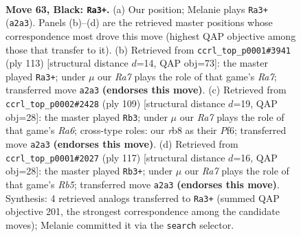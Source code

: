 \documentclass[11pt]{article}
\begin{document}
\clearpage

\begin{figure}[p]\centering
\begin{subfigure}{0.46\textwidth}\centering
\resizebox{\linewidth}{!}{%
\newchessgame
\chessboard[
  setfen={1R6/R4pk1/4p3/8/P3P3/4KP2/r7/8 b - - 18 63},
  showmover=false,
  pgfstyle=straightmove, color=movearrow, markmove={a2-a3}
]}
\caption{}
\end{subfigure}\hfill
\begin{subfigure}{0.46\textwidth}\centering
\resizebox{\linewidth}{!}{%
\newchessgame
\chessboard[
  setfen={8/8/R4pk1/6p1/P5P1/6KP/r7/8 b - - 4 57},
  showmover=false,
  pgfstyle=straightmove, color=movearrow, markmove={a2-a3}
]}
\caption{}
\end{subfigure}
\\[4pt]
\begin{subfigure}{0.46\textwidth}\centering
\resizebox{\linewidth}{!}{%
\newchessgame
\chessboard[
  setfen={8/Rp6/2p1kp2/2P5/P7/r5P1/5PK1/8 b - - 5 55},
  showmover=false,
  pgfstyle=straightmove, color=movearrow, markmove={a3-b3}
]}
\caption{}
\end{subfigure}\hfill
\begin{subfigure}{0.46\textwidth}\centering
\resizebox{\linewidth}{!}{%
\newchessgame
\chessboard[
  setfen={8/R4pk1/8/P6p/1r5P/5KP1/8/8 b - - 0 59},
  showmover=false,
  pgfstyle=straightmove, color=movearrow, markmove={b4-b3}
]}
\caption{}
\end{subfigure}
\caption{\textbf{Move 63, Black: \texttt{Ra3+}.} (a) Our position; Melanie plays \texttt{Ra3+} (\texttt{a2a3}). Panels (b)--(d) are the retrieved master positions whose correspondence most drove this move (highest QAP objective among those that transfer to it). (b) Retrieved from \texttt{ccrl\_top\_p0001\#3941} (ply 113) [structural distance $d$=14, QAP obj=73]: the master played \texttt{Ra3+}; under $\mu$ our \emph{Ra7} plays the role of that game's \emph{Ra7}; transferred move \texttt{a2a3} \textbf{(endorses this move)}. (c) Retrieved from \texttt{ccrl\_top\_p0002\#2428} (ply 109) [structural distance $d$=19, QAP obj=28]: the master played \texttt{Rb3}; under $\mu$ our \emph{Ra7} plays the role of that game's \emph{Ra6}; cross-type roles: our \emph{r}b8 as their \emph{P}f6; transferred move \texttt{a2a3} \textbf{(endorses this move)}. (d) Retrieved from \texttt{ccrl\_top\_p0001\#2027} (ply 117) [structural distance $d$=16, QAP obj=28]: the master played \texttt{Rb3+}; under $\mu$ our \emph{Ra7} plays the role of that game's \emph{Rb5}; transferred move \texttt{a2a3} \textbf{(endorses this move)}. Synthesis: 4 retrieved analogs transferred to \texttt{Ra3+} (summed QAP objective 201, the strongest correspondence among the candidate moves); Melanie committed it via the \texttt{search} selector.}
\label{fig:thought-m125}
\end{figure}
\end{document}
